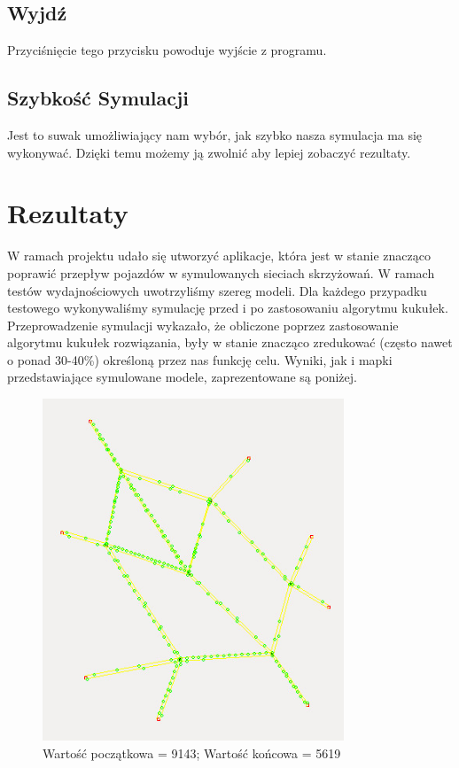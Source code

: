 \documentclass{article}
\begin{document}
\subsection{Wyjdź}
    Przyciśnięcie tego przycisku powoduje wyjście z programu.

\subsection{Szybkość Symulacji}
    Jest to suwak umożliwiający nam wybór, jak szybko nasza symulacja ma się wykonywać. Dzięki temu możemy ją zwolnić aby lepiej zobaczyć rezultaty.

\section{Rezultaty}

W ramach projektu udało się utworzyć aplikacje, która jest w stanie znacząco poprawić przepływ pojazdów w symulowanych sieciach skrzyżowań. W ramach testów wydajnościowych uwotrzyliśmy szereg modeli. Dla każdego przypadku testowego wykonywaliśmy symulację przed i po zastosowaniu algorytmu kukułek. Przeprowadzenie symulacji wykazało, że obliczone poprzez zastosowanie algorytmu kukułek rozwiązania, były w stanie znacząco zredukować (często nawet o ponad 30-40\%) określoną przez nas funkcję celu. Wyniki, jak i mapki przedstawiające symulowane modele, zaprezentowane są poniżej.

\begin{figure}[ht!]
\centering
\includegraphics[width=90mm]{map1.jpg}
\caption{Wartość początkowa = 9143; Wartość końcowa = 5619}
\label{overflow}
\end{figure}
\end{document}
